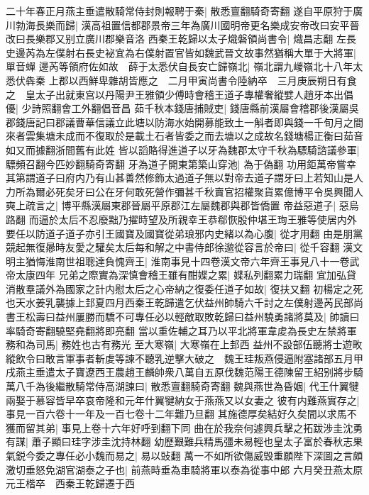 二十年春正月燕主垂遣散騎常侍封則報聘于秦|{
	散悉亶翻騎奇寄翻}
遂自平原狩于廣川勃海長樂而歸|{
	漢高祖置信都郡景帝三年為廣川國明帝更名樂成安帝改曰安平晉改曰長樂郡又别立廣川郡樂音洛}
西秦王乾歸以太子熾磐領尚書令|{
	熾昌志翻}
左長史邊芮為左僕射右長史袐宜為右僕射置官皆如魏武晉文故事然猶稱大單于大將軍|{
	單音蟬}
邊芮等領府佐如故　薛于太悉伏自長安亡歸嶺北|{
	嶺北謂九嵕嶺北十八年太悉伏犇秦}
上郡以西鮮卑雜胡皆應之　二月甲寅尚書令陸納卒　三月庚辰朔日有食之　皇太子出就東宫以丹陽尹王雅領少傅時會稽王道子專權奢縱嬖人趙牙本出倡優|{
	少詩照翻會工外翻倡音昌}
茹千秋本錢唐捕賊吏|{
	錢唐縣前漢屬會稽郡後漢屬吳郡錢唐記曰郡議曹華信議立此塘以防海水始開募能致土一斛者即與錢一千旬月之間來者雲集塘未成而不復取於是載土石者皆委之而去塘以之成故名錢塘楊正衡曰茹音如又而據翻浙間舊有此姓}
皆以謟賂得進道子以牙為魏郡太守千秋為驃騎諮議參軍|{
	驃頻召翻今匹妙翻騎奇寄翻}
牙為道子開東第築山穿池|{
	為于偽翻}
功用鉅萬帝嘗幸其第謂道子曰府内乃有山甚善然修飾太過道子無以對帝去道子謂牙曰上若知山是人力所為爾必死矣牙曰公在牙何敢死營作彌甚千秋賣官招權聚貨累億博平令吳興聞人奭上疏言之|{
	博平縣漢屬東郡晉屬平原郡江左屬魏郡與郡皆僑置}
帝益惡道子|{
	惡烏路翻}
而逼於太后不忍廢黜乃擢時望及所親幸王恭郗恢殷仲堪王珣王雅等使居内外要任以防道子道子亦引王國寶及國寶從弟琅邪内史緒以為心腹|{
	從才用翻}
由是朋黨競起無復曏時友愛之驩矣太后每和解之中書侍郎徐邈從容言於帝曰|{
	從千容翻}
漢文明主猶悔淮南世祖聰達負愧齊王|{
	淮南事見十四卷漢文帝六年齊王事見八十一卷武帝太康四年}
兄弟之際實為深慎會稽王雖有酣媟之累|{
	媟私列翻累力瑞翻}
宜加弘貸消散羣議外為國家之計内慰太后之心帝納之復委任道子如故|{
	復扶又翻}
初楊定之死也天水姜乳襲據上邽夏四月西秦王乾歸遣乞伏益州帥騎六千討之左僕射邊芮民部尚書王松壽曰益州屢勝而驕不可專任必以輕敵取敗乾歸曰益州驍勇諸將莫及|{
	帥讀曰率騎奇寄翻驍堅堯翻將即亮翻}
當以重佐輔之耳乃以平北將軍韋䖍為長史左禁將軍務和為司馬|{
	務姓也古有務光}
至大寒嶺|{
	大寒嶺在上邽西}
益州不設部伍聽將士遊畋縱飲令曰敢言軍事者斬䖍等諫不聽乳逆擊大破之　魏王珪叛燕侵逼附塞諸部五月甲戌燕主垂遣太子寶遼西王農趙王麟帥衆八萬自五原伐魏范陽王德陳留王紹别將步騎萬八千為後繼散騎常侍高湖諫曰|{
	散悉亶翻騎奇寄翻}
魏與燕世為昏姻|{
	代王什翼犍兩娶于慕容皆早卒哀帝隆和元年什翼犍納女于燕燕又以女妻之}
彼有内難燕實存之|{
	事見一百六卷十一年及一百七卷十二年難乃旦翻}
其施德厚矣結好久矣間以求馬不獲而留其弟|{
	事見上卷十六年好呼到翻下同}
曲在於我奈何遽興兵擊之拓跋涉圭沈勇有謀|{
	蕭子顯曰珪字涉圭沈持林翻}
幼歷艱難兵精馬彊未易輕也皇太子富於春秋志果氣鋭今委之專任必小魏而易之|{
	易以䜴翻}
萬一不如所欲傷威毁重願陛下深圖之言頗激切垂怒免湖官湖泰之子也|{
	前燕時垂為車騎將軍以泰為從事中郎}
六月癸丑燕太原元王楷卒　西秦王乾歸遷于西

